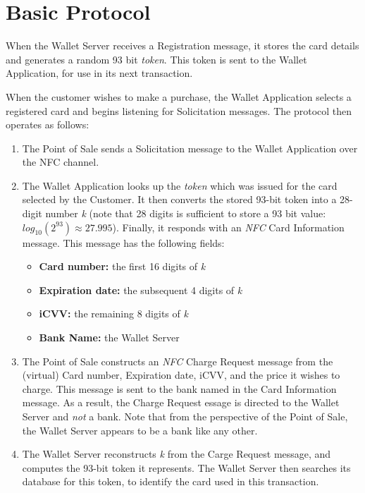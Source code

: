 \section{Basic Protocol}
\label{unlinkable-design-1}

When the Wallet Server receives a Registration message, it stores the card details and generates a random 93 bit \emph{token}.
This token is sent to the Wallet Application, for use in its next transaction.

When the customer wishes to make a purchase, the Wallet Application selects a registered card and begins listening for Solicitation messages.
The protocol then operates as follows:
\begin{enumerate}
\item The Point of Sale sends a Solicitation message to the Wallet Application over the NFC channel.
\item The Wallet Application looks up the \emph{token} which was issued for the card selected by the Customer.
    It then converts the stored 93-bit token into a 28-digit number \emph{k}
    (note that 28 digits is sufficient to store a 93 bit value: $log_{10}(2^{93}) \approx 27.995$).
    Finally, it responds with an \emph{NFC} Card Information message.
    This message has the following fields:
    \begin{itemize}
    \item \textbf{Card number:} the first 16 digits of \emph{k}
    \item \textbf{Expiration date:} the subsequent 4 digits of \emph{k}
    \item \textbf{iCVV:} the remaining 8 digits of \emph{k}
    \item \textbf{Bank Name:} the Wallet Server
   	\end{itemize}
\item The Point of Sale constructs an \emph{NFC} Charge Request message from the (virtual) Card number, Expiration date, iCVV, and the price it wishes to charge.
	This message is sent to the bank named in the Card Information message.
    As a result, the Charge Request essage is directed to the Wallet Server and \emph{not} a bank.
    Note that from the perspective of the Point of Sale, the Wallet Server appears to be a bank like any other.
\item The Wallet Server reconstructs \emph{k} from the Carge Request message, and computes the 93-bit token it represents.
    The Wallet Server then searches its database for this token, to identify the card used in this transaction.

\end{enumerate}
